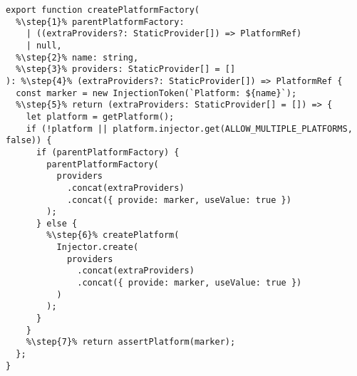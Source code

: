 \begin{verbatim}
export function createPlatformFactory(
  %\step{1}% parentPlatformFactory:
    | ((extraProviders?: StaticProvider[]) => PlatformRef)
    | null,
  %\step{2}% name: string,
  %\step{3}% providers: StaticProvider[] = []
): %\step{4}% (extraProviders?: StaticProvider[]) => PlatformRef {
  const marker = new InjectionToken(`Platform: ${name}`);
  %\step{5}% return (extraProviders: StaticProvider[] = []) => {
    let platform = getPlatform();
    if (!platform || platform.injector.get(ALLOW_MULTIPLE_PLATFORMS, false)) {
      if (parentPlatformFactory) {
        parentPlatformFactory(
          providers
            .concat(extraProviders)
            .concat({ provide: marker, useValue: true })
        );
      } else {
        %\step{6}% createPlatform(
          Injector.create(
            providers
              .concat(extraProviders)
              .concat({ provide: marker, useValue: true })
          )
        );
      }
    }
    %\step{7}% return assertPlatform(marker);
  };
}
\end{verbatim}
